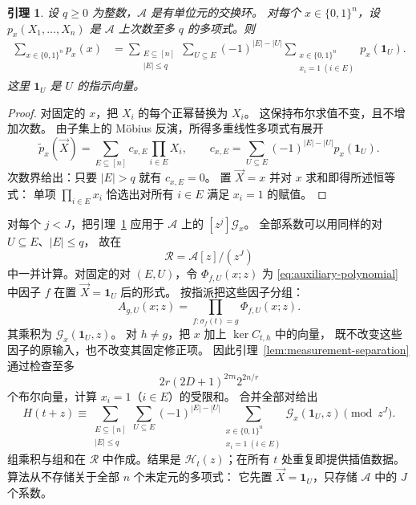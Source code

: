 \documentclass[11pt,reqno]{amsart}
\numberwithin{equation}{section}
\newtheorem{lemma}[theorem]{引理}
\theoremstyle{definition}\newtheorem{definition}[theorem]{定义}
\theoremstyle{remark}\newtheorem{remark}[theorem]{注}
\renewcommand{\le}{\leqslant}
\renewcommand{\ge}{\geqslant}
\begin{document}
\begin{lemma}\label{lem:boolean-differences}
设 $q\ge0$ 为整数，$\mathcal A$ 是有单位元的交换环。
对每个 $x\in\{0,1\}^n$，设
$p_x(X_1,\ldots,X_n)$ 是 $\mathcal A$ 上次数至多 $q$
的多项式。则
\begin{align}
 \sum_{x\in\{0,1\}^n}p_x(x)
 &=\sum_{\substack{E\subseteq[n]\\|E|\le q}}
   \sum_{U\subseteq E}(-1)^{|E|-|U|}
   \sum_{\substack{x\in\{0,1\}^n\\x_i=1\ (i\in E)}}
                  p_x(\mathbf1_U).
 \label{eq:boolean-differences}
\end{align}
这里 $\mathbf1_U$ 是 $U$ 的指示向量。
\end{lemma}
\begin{proof}
对固定的 $x$，把 $X_i$ 的每个正幂替换为 $X_i$。
这保持布尔求值不变，且不增加次数。
由子集上的 M\"obius 反演，所得多重线性多项式有展开
\[
 \widetilde p_x(\vec{X})=\sum_{E\subseteq[n]}c_{x,E}\prod_{i\in E}X_i,
 \qquad
 c_{x,E}=\sum_{U\subseteq E}(-1)^{|E|-|U|}p_x(\mathbf1_U).
\]
次数界给出：只要 $|E|>q$ 就有 $c_{x,E}=0$。
置 $\vec{X}=x$ 并对 $x$ 求和即得所述恒等式：
单项 $\prod_{i\in E}x_i$ 恰选出对所有 $i\in E$
满足 $x_i=1$ 的赋值。
\end{proof}

对每个 $j<J$，把引理~\ref{lem:boolean-differences}
应用于 $\mathcal A$ 上的 $[z^j]\mathcal G_x$。
全部系数可以用同样的对 $U\subseteq E$、$|E|\le q$，
故在
\[
 \mathcal R=\mathcal A[z]/(z^J)
\]
中一并计算。对固定的对 $(E,U)$，令 $\Phi_{f,U}(x;z)$
为 \eqref{eq:auxiliary-polynomial} 中因子 $f$
在置 $\vec X=\mathbf1_U$ 后的形式。
按指派把这些因子分组：
\begin{equation}\label{eq:group-polynomial}
 A_{g,U}(x;z)=\prod_{f:\sigma_f(t)=g}\Phi_{f,U}(x;z).
\end{equation}
其乘积为 $\mathcal G_x(\mathbf1_U,z)$。
对 $h\ne g$，把 $x$ 加上 $\ker C_{t,h}$ 中的向量，
既不改变这些因子的原输入，也不改变其固定修正项。
因此引理~\ref{lem:measurement-separation} 通过检查至多
\begin{equation}\label{eq:boolean-enumeration}
 2r(2D+1)^{2\tau n}2^{2n/r}
\end{equation}
个布尔向量，计算 $x_i=1$（$i\in E$）的受限和。
合并全部对给出
\begin{equation}\label{eq:full-taylor-sum}
 H(t+z)\equiv
 \sum_{\substack{E\subseteq[n]\\|E|\le q}}
 \sum_{U\subseteq E}(-1)^{|E|-|U|}
 \sum_{\substack{x\in\{0,1\}^n\\x_i=1\ (i\in E)}}
       \mathcal G_x(\mathbf1_U,z)\pmod{z^J}.
\end{equation}
组乘积与组和在 $\mathcal R$ 中作成。结果是
$\mathcal H_t(z)$；在所有 $t$ 处重复即提供插值数据。
算法从不存储关于全部 $n$ 个未定元的多项式：
它先置 $\vec X=\mathbf1_U$，只存储 $\mathcal A$ 中的
$J$ 个系数。
\end{document}
